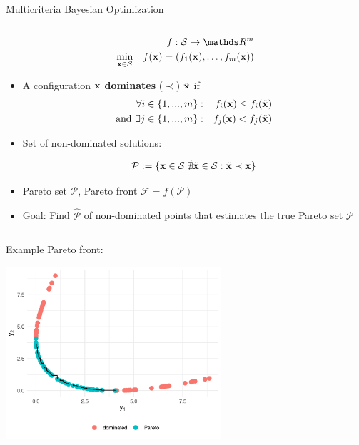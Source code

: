\documentclass[11pt,compress,t,notes=noshow, xcolor=table]{beamer}
\begin{document}
\begin{vbframe}{Multicriteria Bayesian Optimization}
\begin{columns}
\begin{column}{0.60\textwidth}
\begin{eqnarray*}
  && f: \mathcal{S} \rightarrow \R^m\\
  \min \limits_{\xv \in \mathcal{S}} && f(\xv) = \left(f_1(\xv), \ldots, f_m(\xv)\right)
\end{eqnarray*}
\vspace{-1em}
\begin{itemize}
  \item A configuration $\mathbf{x}$ \textbf{dominates} ($\prec$) $\tilde{\mathbf{x}}$ if
\begin{eqnarray*}
  \forall i \in \{ 1, ..., m\}: && f_i(\mathbf{x}) \leq f_i(\tilde{\mathbf{x}})\\
  \text{and}~\exists j \in \{1, ..., m\}: && f_j(\mathbf{x}) < f_j(\tilde{\mathbf{x}})
\end{eqnarray*}
\item Set of non-dominated solutions:
  \begin{small}
  \begin{align*}
    \mathcal{P} := \{\mathbf{x} \in \mathcal{S} | \nexists \tilde{\mathbf{x}} \in \mathcal{S}: \tilde{\mathbf{x}} \prec \mathbf{x} \}
\end{align*}
\end{small}
\item Pareto set $\mathcal{P}$, Pareto front $\mathcal{F} = f(\mathcal{P})$
\item{Goal:} Find $\hat{\mathcal{P}}$ of non-dominated points that estimates the true Pareto set $\mathcal{P}$
\end{itemize}
\end{column}
\end{columns}

\framebreak

Example Pareto front:

\vspace{+0.45cm}
\begin{center}
  \includegraphics[width = 0.6\textwidth]{figure_man/multicrit_0.png}
\end{center}


\end{vbframe}
\end{document}

